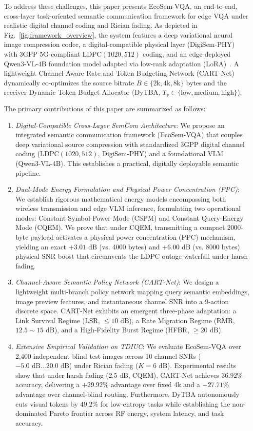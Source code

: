 To address these challenges, this paper presents EcoSem-VQA, an end-to-end, cross-layer task-oriented semantic communication framework for edge VQA under realistic digital channel coding and Rician fading. As depicted in Fig.~\ref{fig:framework_overview}, the system features a deep variational neural image compression codec, a digital-compatible physical layer (DigiSem-PHY) with 3GPP 5G-compliant $\text{LDPC}(1020, 512)$ coding, and an edge-deployed Qwen3-VL-4B foundation model adapted via low-rank adaptation (LoRA)~\cite{hu2021lora,dettmers2024qlora}. A lightweight Channel-Aware Rate and Token Budgeting Network (CART-Net) dynamically co-optimizes the source bitrate $B \in \{2\text{k}, 4\text{k}, 8\text{k}\}$ bytes and the receiver Dynamic Token Budget Allocator (DyTBA, $T_v \in \{\mathrm{low}, \mathrm{medium}, \mathrm{high}\}$).

The primary contributions of this paper are summarized as follows:
\begin{enumerate}
    \item \textit{Digital-Compatible Cross-Layer SemCom Architecture}: We propose an integrated semantic communication framework (EcoSem-VQA) that couples deep variational source compression with standardized 3GPP digital channel coding ($\text{LDPC}(1020, 512)$, DigiSem-PHY) and a foundational VLM (Qwen3-VL-4B). This establishes a practical, digitally deployable semantic pipeline.
    \item \textit{Dual-Mode Energy Formulation and Physical Power Concentration (PPC)}: We establish rigorous mathematical energy models encompassing both wireless transmission and edge VLM inference, formulating two operational modes: Constant Symbol-Power Mode (CSPM) and Constant Query-Energy Mode (CQEM). We prove that under CQEM, transmitting a compact 2000-byte payload activates a physical power concentration (PPC) mechanism, yielding an exact $+3.01\text{ dB}$ (vs. 4000 bytes) and $+6.00\text{ dB}$ (vs. 8000 bytes) physical SNR boost that circumvents the LDPC outage waterfall under harsh fading.
    \item \textit{Channel-Aware Semantic Policy Network (CART-Net)}: We design a lightweight multi-branch policy network mapping query semantic embeddings, image preview features, and instantaneous channel SNR into a 9-action discrete space. CART-Net exhibits an emergent three-phase adaptation: a Link Survival Regime (LSR, $\le 10\text{ dB}$), a Rate Migration Regime (RMR, $12.5 \sim 15\text{ dB}$), and a High-Fidelity Burst Regime (HFBR, $\ge 20\text{ dB}$).
    \item \textit{Extensive Empirical Validation on TDIUC}: We evaluate EcoSem-VQA over 2,400 independent blind test images across 10 channel SNRs ($-5.0\text{ dB} \dots 20.0\text{ dB}$) under Rician fading ($K=6\text{ dB}$). Experimental results show that under harsh fading ($2.5\text{ dB}$, CQEM), CART-Net achieves $36.92\%$ accuracy, delivering a $+29.92\%$ advantage over fixed 4k and a $+27.71\%$ advantage over channel-blind routing. Furthermore, DyTBA autonomously cuts visual tokens by $49.2\%$ for low-entropy tasks while establishing the non-dominated Pareto frontier across RF energy, system latency, and task accuracy.
\end{enumerate}

